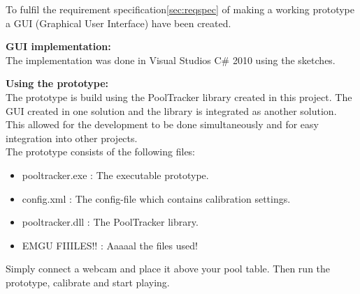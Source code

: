 To fulfil the requirement specification\ref{sec:reqspec} of making a working prototype a GUI (Graphical User Interface) have been created. 

\textbf{GUI implementation:}\\
The implementation was done in Visual Studios C\# 2010 using the sketches. 


\textbf{Using the prototype:}\\
The prototype is build using the PoolTracker library created in this project. The GUI created in one solution and the library is integrated as another solution. This allowed for the development to be done simultaneously and for easy integration into other projects.\\
The prototype consists of the following files:
\begin{itemize}
	\item pooltracker.exe : The executable prototype.
	\item config.xml	  : The config-file which contains calibration settings.
	\item pooltracker.dll : The PoolTracker library.
	\item EMGU FIIILES!!  : Aaaaal the files used!
\end{itemize}

Simply connect a webcam and place it above your pool table. Then run the prototype, calibrate and start playing.